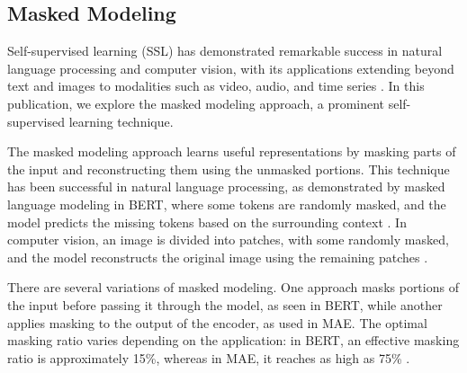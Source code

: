 \documentclass[12pt]{article} %
\begin{document}


\subsection{Masked Modeling}
Self-supervised learning (SSL) has demonstrated remarkable success in natural language processing and computer vision, with its applications extending beyond text and images to modalities such as video, audio, and time series \citep{balestriero2023cookbook}. In this publication, we explore the masked modeling approach, a prominent self-supervised learning technique.

The masked modeling approach learns useful representations by masking parts of the input and reconstructing them using the unmasked portions. This technique has been successful in natural language processing, as demonstrated by masked language modeling in BERT, where some tokens are randomly masked, and the model predicts the missing tokens based on the surrounding context \citep{devlin2019bert}. In computer vision, an image is divided into patches, with some randomly masked, and the model reconstructs the original image using the remaining patches \citep{he2022masked}.

There are several variations of masked modeling. One approach masks portions of the input before passing it through the model, as seen in BERT, while another applies masking to the output of the encoder, as used in MAE. The optimal masking ratio varies depending on the application: in BERT, an effective masking ratio is approximately 15\%, whereas in MAE, it reaches as high as 75\% \citep{yao2022masked}.
\end{document}
